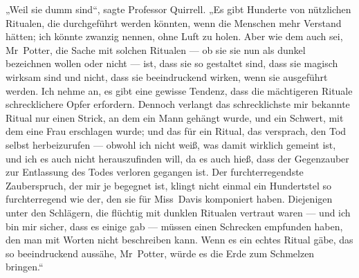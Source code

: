 „Weil sie dumm sind“, sagte Professor Quirrell.
„Es gibt Hunderte von nützlichen Ritualen, die durchgeführt werden könnten, wenn die Menschen mehr Verstand hätten; ich könnte zwanzig nennen, ohne Luft zu holen. Aber wie dem auch sei, Mr~Potter, die Sache mit solchen Ritualen — ob sie sie nun als dunkel bezeichnen wollen oder nicht — ist, dass sie so gestaltet sind, dass sie magisch wirksam sind und nicht, dass sie beeindruckend wirken, wenn sie ausgeführt werden. Ich nehme an, es gibt eine gewisse Tendenz, dass die mächtigeren Rituale schrecklichere Opfer erfordern. Dennoch verlangt das schrecklichste mir bekannte Ritual nur einen Strick, an dem ein Mann gehängt wurde, und ein Schwert, mit dem eine Frau erschlagen wurde; und das für ein Ritual, das versprach, den Tod selbst herbeizurufen — obwohl ich nicht weiß, was damit wirklich gemeint ist, und ich es auch nicht herauszufinden will, da es auch hieß, dass der Gegenzauber zur Entlassung des Todes verloren gegangen ist. Der furchterregendste Zauberspruch, der mir je begegnet ist, klingt nicht einmal ein Hundertstel so furchterregend wie der, den sie für Miss~Davis komponiert haben. Diejenigen unter den Schlägern, die flüchtig mit dunklen Ritualen vertraut waren — und ich bin mir sicher, dass es einige gab — müssen einen Schrecken empfunden haben, den man mit Worten nicht beschreiben kann. Wenn es ein echtes Ritual gäbe, das so beeindruckend aussähe, Mr~Potter, würde es die Erde zum Schmelzen bringen.“


